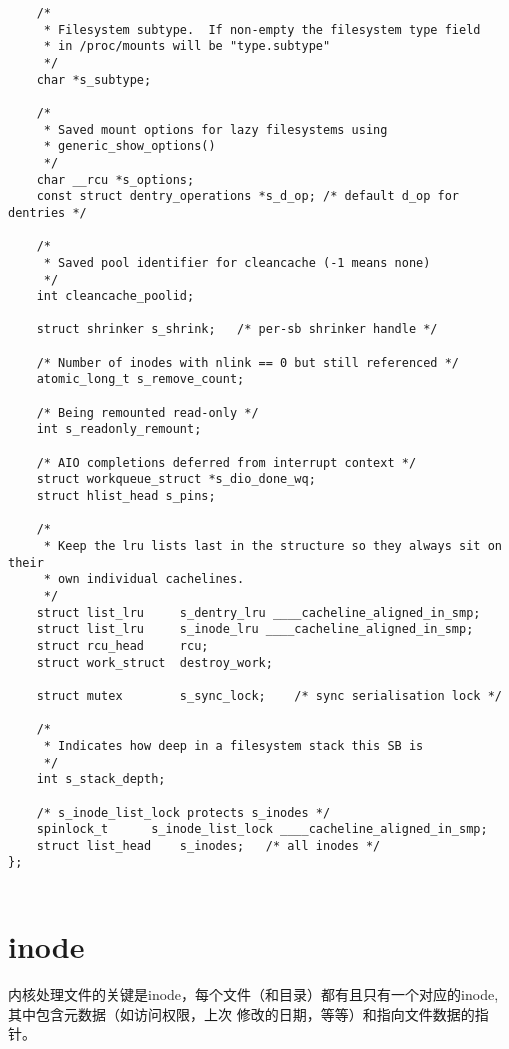 \begin{lstlisting}
	/*
	 * Filesystem subtype.  If non-empty the filesystem type field
	 * in /proc/mounts will be "type.subtype"
	 */
	char *s_subtype;

	/*
	 * Saved mount options for lazy filesystems using
	 * generic_show_options()
	 */
	char __rcu *s_options;
	const struct dentry_operations *s_d_op; /* default d_op for dentries */

	/*
	 * Saved pool identifier for cleancache (-1 means none)
	 */
	int cleancache_poolid;

	struct shrinker s_shrink;	/* per-sb shrinker handle */

	/* Number of inodes with nlink == 0 but still referenced */
	atomic_long_t s_remove_count;

	/* Being remounted read-only */
	int s_readonly_remount;

	/* AIO completions deferred from interrupt context */
	struct workqueue_struct *s_dio_done_wq;
	struct hlist_head s_pins;

	/*
	 * Keep the lru lists last in the structure so they always sit on their
	 * own individual cachelines.
	 */
	struct list_lru		s_dentry_lru ____cacheline_aligned_in_smp;
	struct list_lru		s_inode_lru ____cacheline_aligned_in_smp;
	struct rcu_head		rcu;
	struct work_struct	destroy_work;

	struct mutex		s_sync_lock;	/* sync serialisation lock */

	/*
	 * Indicates how deep in a filesystem stack this SB is
	 */
	int s_stack_depth;

	/* s_inode_list_lock protects s_inodes */
	spinlock_t		s_inode_list_lock ____cacheline_aligned_in_smp;
	struct list_head	s_inodes;	/* all inodes */
};
        
\end{lstlisting}



\section{inode}

内核处理文件的关键是inode，每个文件（和目录）都有且只有一个对应的inode,其中包含元数据（如访问权限，上次
修改的日期，等等）和指向文件数据的指针。

